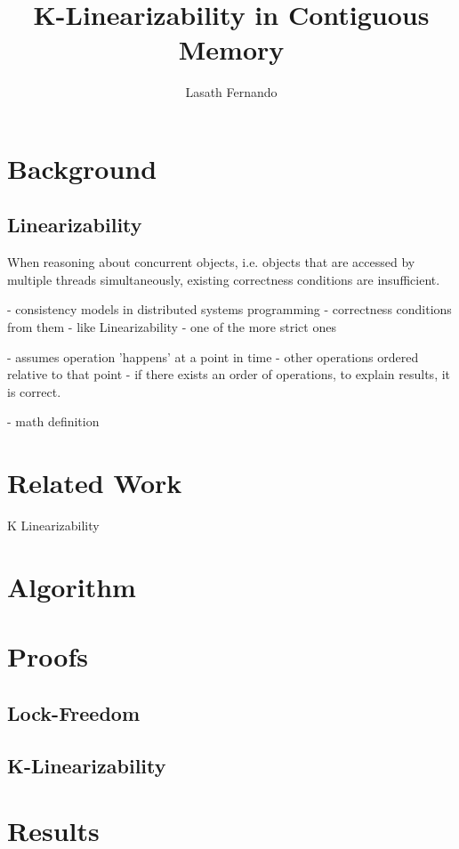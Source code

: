 \documentclass[a4paper,10pt]{article}
\title{K-Linearizability in Contiguous Memory}
\author{Lasath Fernando}
\begin{document}
\maketitle

\begin{abstract}

\end{abstract}

\section{Background}
\subsection{Linearizability}
When reasoning about concurrent objects, i.e. objects that are accessed by multiple threads simultaneously, existing correctness conditions are insufficient.

- consistency models in distributed systems programming
- correctness conditions from them
  - like Linearizability
  - one of the more strict ones

- assumes operation 'happens' at a point in time
  - other operations ordered relative to that point
  - if there exists an order of operations, to explain results, it is correct.

- math definition

\section{Related Work}
K Linearizability
\section{Algorithm}
\section{Proofs}
\subsection{Lock-Freedom}
\subsection{K-Linearizability}
\section{Results}
\end{document}
